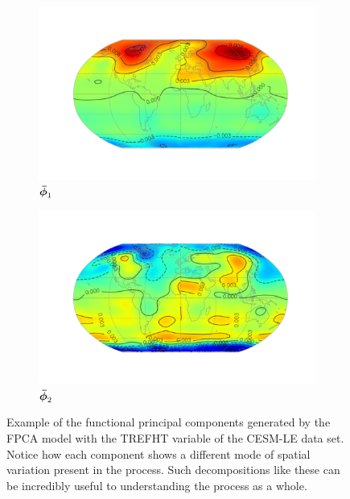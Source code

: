 \begin{figure}
	\centering
	\begin{subfigure}[b]{0.45\textwidth}
		\includegraphics[width=\textwidth]{ftsm_res_TREFHT_fpc_0}
		\caption{$\bm{{\bar{\phi}}}_{1}$}
		\label{fig:ftsm_res_TREFHT_fpc_1}
	\end{subfigure}             
	\begin{subfigure}[b]{0.45\textwidth}
		\includegraphics[width=\textwidth]{ftsm_res_TREFHT_fpc_1}
		\caption{$\bm{{\bar{\phi}}}_{2}$}
		\label{fig:ftsm_res_TREFHT_fpc_2}
	\end{subfigure}
	\caption[Example of the functional principal components generated by the FPCA model with the TREFHT variable.]{Example of the functional principal components generated by the FPCA model with the TREFHT variable of the CESM-LE data set. Notice how each component shows a different mode of spatial variation present in the process. Such decompositions like these can be incredibly useful to understanding the process as a whole.}
	\label{fig:ftsm_res_TREFHT_fpc}
\end{figure}

